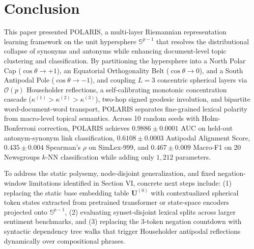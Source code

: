 \documentclass[journal]{IEEEtran}
\begin{document}
\section{Conclusion}
This paper presented POLARIS, a multi-layer Riemannian representation learning framework on the unit hypersphere $\mathbb{S}^{p-1}$ that resolves the distributional collapse of synonyms and antonyms while enhancing document-level topic clustering and classification. By partitioning the hypersphere into a North Polar Cap ($\cos\theta \to +1$), an Equatorial Orthogonality Belt ($\cos\theta \to 0$), and a South Antipodal Pole ($\cos\theta \to -1$), and coupling $L = 3$ concentric spherical layers via $\mathcal{O}(p)$ Householder reflections, a self-calibrating monotonic concentration cascade ($\kappa^{(1)} > \kappa^{(2)} > \kappa^{(3)}$), two-hop signed geodesic involution, and bipartite word-document-word transport, POLARIS separates fine-grained lexical polarity from macro-level topical semantics. Across 10 random seeds with Holm-Bonferroni correction, POLARIS achieves $0.9886 \pm 0.0001$ AUC on held-out antonym-synonym link classification, $0.6108 \pm 0.0003$ Antipodal Alignment Score, $0.435 \pm 0.004$ Spearman's $\rho$ on SimLex-999, and $0.467 \pm 0.009$ Macro-F1 on 20 Newsgroups $k$-NN classification while adding only $1,212$ parameters.

To address the static polysemy, node-disjoint generalization, and fixed negation-window limitations identified in Section VI, concrete next steps include: (1) replacing the static base embedding table $\mathbf{U}^{(0)}$ with contextualized spherical token states extracted from pretrained transformer or state-space encoders projected onto $\mathbb{S}^{p-1}$, (2) evaluating synset-disjoint lexical splits across larger sentiment benchmarks, and (3) replacing the 3-token negation countdown with syntactic dependency tree walks that trigger Householder antipodal reflections dynamically over compositional phrases.
\end{document}
